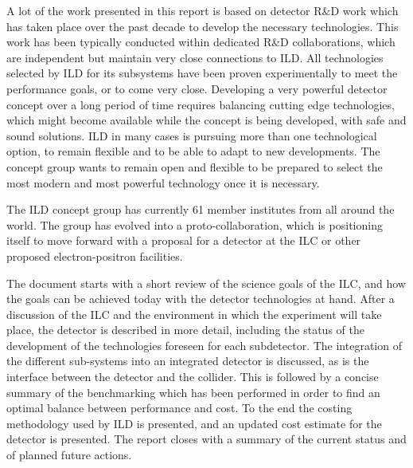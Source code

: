 A lot of the work presented in this report is based on detector R\&D work which has taken place over the past decade to develop the necessary technologies. 
This work has been typically conducted within dedicated R\&D collaborations, which are independent but maintain very close connections to ILD. All technologies selected by ILD for its subsystems have been proven experimentally to meet the performance goals, or to come very close. Developing a very powerful detector concept over a long period of time requires balancing cutting edge technologies, which might become available while the concept is being developed, with safe and sound solutions. ILD in many cases is pursuing more than one technological option, to remain flexible and to be able to adapt to new developments. The concept group  wants to remain open and flexible to be prepared to select the most modern and most powerful technology once it is necessary. 

The ILD concept group has currently 61 member institutes from all around the world. The group has evolved into a proto-collaboration, which is positioning itself to move forward with a proposal for a detector at the ILC or other proposed electron-positron facilities.

The document starts with a short review of the science goals of the ILC, and how the goals can be achieved today with the detector technologies at hand. After a discussion of the ILC and the environment in which the experiment will take place, the detector is described in more detail, including the status of the development of the technologies foreseen for each subdetector. The integration of the different sub-systems into an integrated detector is discussed, as is the interface between the detector and the collider. This is followed by a concise summary of the benchmarking which has been performed in order to find an optimal balance between performance and cost. To the end the costing methodology used by ILD is presented, and an updated cost estimate for the detector is presented. The report closes with a summary of the current status and of planned future actions. 

